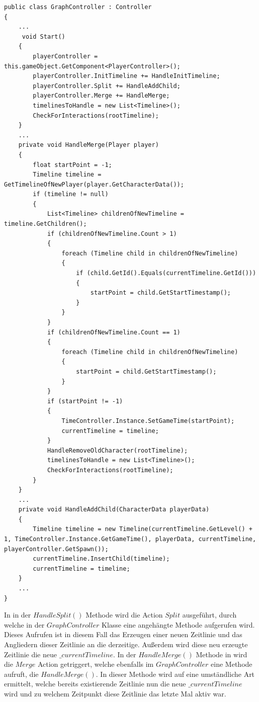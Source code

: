 \begin{lstlisting}[caption={Split und Merge listener}, label={sec:split_merge_old_graph}]
public class GraphController : Controller
{
    ...
     void Start()
    {
        playerController = this.gameObject.GetComponent<PlayerController>();
        playerController.InitTimeline += HandleInitTimeline;
        playerController.Split += HandleAddChild;
        playerController.Merge += HandleMerge;
        timelinesToHandle = new List<Timeline>();
        CheckForInteractions(rootTimeline);
    }
    ...
    private void HandleMerge(Player player)
    {
        float startPoint = -1;
        Timeline timeline = GetTimelineOfNewPlayer(player.GetCharacterData());
        if (timeline != null)
        {
            List<Timeline> childrenOfNewTimeline = timeline.GetChildren();
            if (childrenOfNewTimeline.Count > 1)
            {
                foreach (Timeline child in childrenOfNewTimeline)
                {
                    if (child.GetId().Equals(currentTimeline.GetId()))
                    {
                        startPoint = child.GetStartTimestamp();
                    }
                }
            }
            if (childrenOfNewTimeline.Count == 1)
            {
                foreach (Timeline child in childrenOfNewTimeline)
                {
                    startPoint = child.GetStartTimestamp();
                }
            }
            if (startPoint != -1)
            {
                TimeController.Instance.SetGameTime(startPoint);
                currentTimeline = timeline;
            }
            HandleRemoveOldCharacter(rootTimeline);
            timelinesToHandle = new List<Timeline>();
            CheckForInteractions(rootTimeline);
        }
    }
    ...
    private void HandleAddChild(CharacterData playerData)
    {
        Timeline timeline = new Timeline(currentTimeline.GetLevel() + 1, TimeController.Instance.GetGameTime(), playerData, currentTimeline, playerController.GetSpawn());
        currentTimeline.InsertChild(timeline);
        currentTimeline = timeline;
    }
    ...
}
\end{lstlisting}

In  in der $HandleSplit()$ Methode wird die Action $Split$ ausgeführt, durch welche in der $GraphController$ Klasse eine angehängte Methode aufgerufen wird. Dieses Aufrufen ist in diesem Fall das Erzeugen einer neuen Zeitlinie und das Angliedern dieser Zeitlinie an die derzeitige. Außerdem wird diese neu erzeugte Zeitlinie die neue $\_currentTimeline$.
In der $HandleMerge()$ Methode in  wird die $Merge$ Action getriggert, welche ebenfalls im $GraphController$ eine Methode aufruft, die $HandleMerge()$. In dieser Methode wird auf eine umständliche Art ermittelt, welche bereits existierende Zeitlinie nun die neue $\_currentTimeline$ wird und zu welchem Zeitpunkt diese Zeitlinie das letzte Mal aktiv war. 

